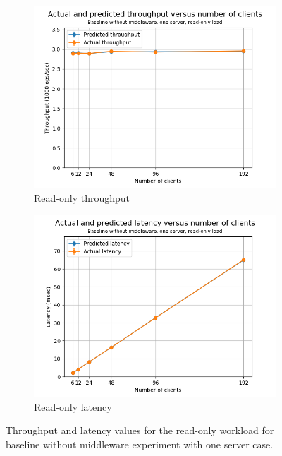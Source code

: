 \documentclass[11pt,a4paper]{article}
\begin{document}
\begin{figure}[h]
\centering
\begin{subfigure}{.5\textwidth}
  \centering
  \includegraphics[width=1.0\linewidth,trim={0px 0px 0px 0px},clip]{img/plot/csb1-ro-law_tpt.png}
  \caption{Read-only throughput}
  \label{fig:csb1-ro-law_tpt}
\end{subfigure}%
\begin{subfigure}{.5\textwidth}
  \centering
  \includegraphics[width=1.0\linewidth,trim={0px 0px 0px 0px},clip]{img/plot/csb1-ro-law_lat.png}
  \caption{Read-only latency}
  \label{fig:csb1-ro-law_lat}
\end{subfigure}
\caption{Throughput and latency values for the read-only workload for baseline without middleware experiment with one server case.}
\label{fig:csb1-ro-law}
\end{figure}
\end{document}
